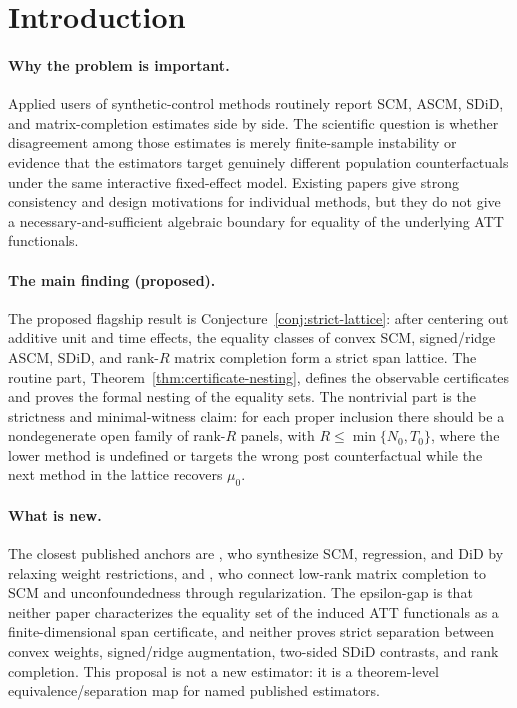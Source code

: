 \documentclass[11pt]{article}
\theoremstyle{definition}
\theoremstyle{plain}
\theoremstyle{remark}
\begin{document}
\section{Introduction}
\paragraph{Why the problem is important.}
Applied users of synthetic-control methods routinely report SCM, ASCM, SDiD,
and matrix-completion estimates side by side. The scientific question is
whether disagreement among those estimates is merely finite-sample instability
or evidence that the estimators target genuinely different population
counterfactuals under the same interactive fixed-effect model. Existing papers
give strong consistency and design motivations for individual methods, but
they do not give a necessary-and-sufficient algebraic boundary for equality of
the underlying ATT functionals.

\paragraph{The main finding (proposed).}
The proposed flagship result is Conjecture~\ref{conj:strict-lattice}: after
centering out additive unit and time effects, the equality classes of convex
SCM, signed/ridge ASCM, SDiD, and rank-$R$ matrix completion form a strict span
lattice. The routine part, Theorem~\ref{thm:certificate-nesting}, defines the
observable certificates and proves the formal nesting of the equality sets.
The nontrivial part is the strictness and minimal-witness claim: for each
proper inclusion there should be a nondegenerate open family of rank-$R$
panels, with $R\le \min\{N_0,T_0\}$, where the lower method is undefined or
targets the wrong post counterfactual while the next method in the lattice
recovers $\mu_0$.

\paragraph{What is new.}
The closest published anchors are \citet{DoudchenkoImbens2016}, who synthesize
SCM, regression, and DiD by relaxing weight restrictions, and
\citet{AtheyBayatiDoudchenkoImbensKhosravi2021}, who connect low-rank matrix
completion to SCM and unconfoundedness through regularization. The epsilon-gap
is that neither paper characterizes the equality set of the induced ATT
functionals as a finite-dimensional span certificate, and neither proves
strict separation between convex weights, signed/ridge augmentation, two-sided
SDiD contrasts, and rank completion. This proposal is not a new estimator: it
is a theorem-level equivalence/separation map for named published estimators.
\end{document}
